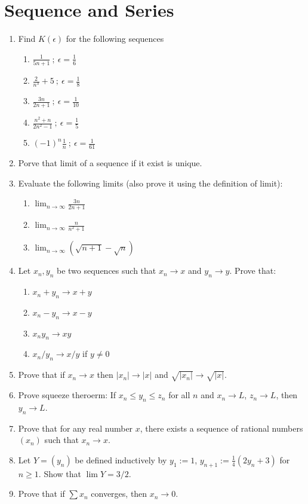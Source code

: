 \documentclass[12pt]{article}
\begin{document}
\newpage

\section{Sequence and Series}

\begin{enumerate}
     \item Find $K(\epsilon ) $ for the following sequences 
    \begin{enumerate}
        \item $\frac{1}{5n+1} ~;~ \epsilon = \frac{1}{6} $
        \item $\frac{2}{n^3}+5 ~; ~\epsilon = \frac{1}{8}$
        \item $\frac{3n}{2n+1} ~; ~\epsilon = \frac{1}{10}$
        \item$\frac{n^2 + n }{2n^2 -1} ~; ~\epsilon = \frac{1}{5}$
        \item$(-1)^n \frac{1 }{n} ~; ~\epsilon = \frac{1}{61}$
    \end{enumerate}

    \item Porve that limit of a sequence if it exist is unique.
    \item Evaluate the following limits (also prove it using the definition of limit):
    \begin{enumerate}
        \item \( \lim_{n \to \infty} \frac{3n}{2n+1} \)
        \item \( \lim_{n \to \infty} \frac{n}{n^2 + 1} \)
        \item \( \lim_{n \to \infty} (\sqrt{n+1} - \sqrt n) \)
    \end{enumerate}
    \item Let $x_n,y_n$ be two sequences such that $x_n \to x$ and $y_n \to y$. Prove that:
    \begin{enumerate}
        \item \( x_n + y_n \to x + y \)
        \item \( x_n - y_n \to x - y \)
        \item \( x_n y_n \to xy \)
        \item \( x_n / y_n \to x/y \) if \( y \neq 0 \)
    \end{enumerate}
    \item Prove that if $x_n\to x$ then $|x_n|\to|x|$ and $\sqrt{|x_n|}\to\sqrt{|x|}$.
    \item Prove squeeze theroerm:
    If \( x_n \leq y_n \leq z_n \) for all \( n \) and \( x_n \to L \), \( z_n \to L \), then \( y_n \to L \).
    \item Prove that for any real number $x$, there exists a sequence of rational numbers $(x_n)$ such that $x_n \to x$.
    \item Let $Y = (y_n)$ be defined inductively by $y_1 := 1$, $y_{n+1} := \frac{1}{4}(2y_n+3)$ for $n \ge 1$. Show that $\lim Y = 3/2$.
    \item Prove that if $\sum x_n$ converges, then $x_n \to 0$.
\end{enumerate}
\end{document}
